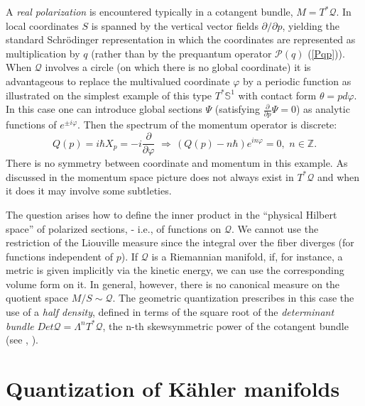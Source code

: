 A {\it real polarization} is encountered typically in a cotangent bundle,
$M = T^*{\mathcal Q}$. In local coordinates $S$ is
spanned by the vertical vector fields $\partial/\partial p$, yielding the
standard Schr\"odinger representation in which
the coordinates are represented as multiplication by $q$ (rather than by the
prequantum operator ${\mathcal P} (q)$ (\ref{Pqp})). When ${\mathcal Q}$ involves a circle
(on which there is no global coordinate) it is advantageous to replace the 
multivalued coordinate $\varphi$ by a periodic function as illustrated on the
simplest example of this type $T^*{\mathbb S}^1$ with contact form $\theta =
pd\varphi$. In this case one can introduce global sections $\Psi$ (satisfying 
$\frac{\partial}{\partial p} \Psi =0$) as analytic functions of $e^{\pm i\varphi}$. Then 
the spectrum of the momentum operator is discrete:
\begin{equation}
\label{pS1}
Q(p) = i\hbar X_p  = -i\frac{\partial}{\partial \varphi} \, \, \Rightarrow
\, (Q(p) - n\hbar) e^{in\varphi} = 0, \, \, n\in{\mathbb Z}.
\end{equation}
There is no symmetry between coordinate and momentum in this example.
 As discussed in \cite{B} the momentum space picture does not always exist 
in $T^*{\mathcal Q}$ and when it does it may involve some subtleties.

The question arises how to define the inner product in the ``physical Hilbert
space'' of polarized sections, - i.e., of functions on ${\mathcal Q}$. We cannot
 use the restriction of the Liouville measure since the integral over the fiber
 diverges (for functions independent of $p$). If ${\mathcal Q}$ is a Riemannian 
manifold, if, for instance, a metric is given implicitly via 
the kinetic energy, we can use the corresponding volume form on it. In general,
however, there is no canonical measure on the quotient space $M/S \sim{\mathcal Q}$. 
The geometric quantization prescribes in this case the use of a {\it half density}, 
defined in terms of the square root of the {\it determinant bundle} $Det{\mathcal Q}
= \Lambda^n T^*{\mathcal Q}$, the n-th skewsymmetric power of the cotangent bundle 
(see \cite{AE}, \cite{B}).

\bigskip

\section{Quantization of K{\"a}hler manifolds}
\setcounter{equation}{0}
\renewcommand\theequation{\thesection.\arabic{equation}}

